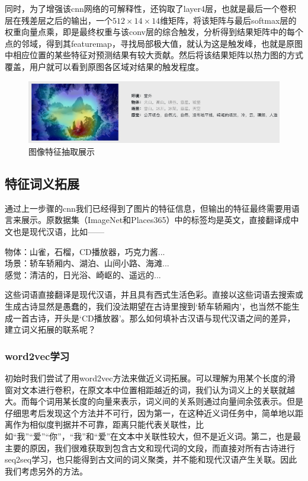 \documentclass[a4paper, 10pt]{article}
\begin{document}
同时，为了增强该cnn网络的可解释性，还钩取了layer4层，也就是最后一个卷积层在残差层之后的输出，一个$512\times 14\times 14$维矩阵，将该矩阵与最后softmax层的权重向量点乘，即是最终权重与该conv层的综合触发，分析得到结果矩阵中的每个点的邻域，得到其featuremap，寻找局部极大值，就认为这是触发峰，也就是原图中相应位置的某些特征对预测结果有较大贡献。然后将该结果矩阵以热力图的方式覆盖，用户就可以看到原图各区域对结果的触发程度。

\begin{figure}[H]
\centering
\includegraphics[width=0.8\linewidth]{imgs/3.png}
\caption{图像特征抽取展示}
\end{figure}

\subsection{特征词义拓展}
通过上一步骤的cnn我们已经得到了图片的特征信息，但输出的特征最终需要用语言来展示。原数据集（ImageNet和Places365）中的标签均是英文，直接翻译成中文也是现代汉语，比如——
\begin{framed}
物体：山雀，石榴，CD播放器，巧克力酱...\\
场景：轿车轿厢内、湖泊、山间小路、海滩...\\
感觉：清洁的，日光浴、崎岖的、遥远的...
\end{framed}

这些词语直接翻译是现代汉语，并且具有西式生活色彩。直接以这些词语去搜索或生成古诗显然是愚蠢的，我们没法期望在古诗里搜到‘轿车轿厢内’，也当然不能生成一首古诗，开头是‘CD播放器’。那么如何填补古汉语与现代汉语之间的差异，建立词义拓展的联系呢？

\subsubsection*{word2vec学习}
初始时我们尝试了用word2vec方法来做近义词拓展。可以理解为用某个长度的滑窗对文本进行卷积，在原文本中位置相距越近的词，我们认为词义上的关联就越大。而每个词用某长度的向量来表示，词义间的关系则通过向量间余弦表示。但是仔细思考后发现这个方法并不可行，因为第一，在这种近义词任务中，简单地以距离作为相似度判据并不可靠，距离只能代表关联性，比如“我”“爱”“你”，“我”和“爱”在文本中关联性较大，但不是近义词。第二，也是最主要的原因，我们很难获取到包含古文和现代词的文段，而直接对所有古诗进行seq2seq学习，也只能得到古文间的词义聚类，并不能和现代汉语产生关联。因此我们考虑另外的方法。
\end{document}
